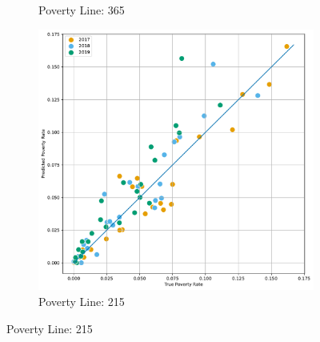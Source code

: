 \begin{figure}[H]
\begin{subfigure}[b]{0.47\textwidth}
            \caption{Poverty Line: 365}
        \end{subfigure} 
        \hfill
        \begin{subfigure}[b]{0.47\textwidth}
            \centering
            \includegraphics[width=\textwidth]{../figures/fig4_2_prediction_wb_vs_true_poverty_rate_regions_p215_scatter.pdf}
            \caption{Poverty Line: 215}
        \end{subfigure} 
\end{figure}

    

